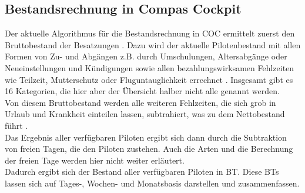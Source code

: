 \documentclass [12pt, a4paper, oneside, titlepage, ngerman]{article}
\begin{document}
\subsection{Bestandsrechnung in Compas Cockpit} \label{bestandsrechnung}
Der aktuelle Algorithmus für die Bestandsrechnung in \ac{COC} ermittelt zuerst den Bruttobestand der Besatzungen \cite[vgl.][S.8]{capfunc}. 
Dazu wird der aktuelle Pilotenbestand mit allen Formen von Zu- und Abgängen z.B. durch Umschulungen, Altersabgänge oder Neueinstellungen und Kündigungen sowie allen bezahlungswirksamen Fehlzeiten wie Teilzeit, Mutterschutz oder Fluguntauglichkeit errechnet \cite[vgl.][S.19]{benutzerhandbuch}. Insgesamt gibt es 16 Kategorien, die hier aber der Übersicht halber nicht alle genannt werden. \\
Von diesem Bruttobestand werden alle weiteren Fehlzeiten, die sich grob in Urlaub und Krankheit einteilen lassen, subtrahiert, was zu dem Nettobestand führt \cite[vgl.][S.8]{capfunc}. \\
Das Ergebnis aller verfügbaren Piloten ergibt sich dann durch die Subtraktion von freien Tagen, die den Piloten zustehen. Auch die Arten und die Berechnung der freien Tage werden hier nicht weiter erläutert. \\
Dadurch ergibt sich der Bestand aller verfügbaren Piloten in \ac{BT}. Diese \acp{BT} lassen sich auf Tages-, Wochen- und Monatsbasis darstellen und zusammenfassen. 
\end{document}
